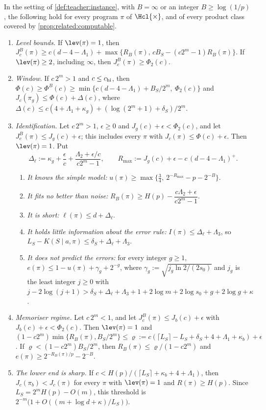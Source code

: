 \begin{theorem}\label{thm:teacher:main}
In the setting of \cref{def:teacher:instance}, with $B=\infty$ or an integer $B\ge\log(1/p)$, the following hold for every program $\pi$ of $\Hcl{\times}$, and of every product class covered by \cref{prop:related:computable}.
\begin{enumerate}[label=(\roman*),start=1,itemsep=1pt,topsep=2pt]
\item[(o)] \emph{Level bounds.} If $\lev(\pi)=1$, then $J^B_c(\pi)\ge c(d-4-\Lambda_1)+\max\{R_B(\pi),\,cB_S-(c2^m-1)R_B(\pi)\}$. If $\lev(\pi)\ge2$, including $\infty$, then $J^B_c(\pi)\ge\Phi_2(c)$.
\item \emph{Window.} If $c\,2^m>1$ and $c\le c_{\rm hi}$, then $\Phi(c)\ge\Phi^B(c)\ge\min\{c(d-4-\Lambda_1)+B_S/2^m,\ \Phi_2(c)\}$ and $J_c(\pi_g)\le\Phi(c)+\Delta(c)$, where $\Delta(c)\le c(4+\Lambda_1+\kappa_g)+(\log(2^m+1)+\delta_S)/2^m$.
\item \emph{Identification.} Let $c\,2^m>1$, $\epsilon\ge0$ and $J_g(c)+\epsilon<\Phi_2(c)$, and let $J^B_c(\pi)\le J_g(c)+\epsilon$; this includes every $\pi$ with $J_c(\pi)\le\Phi(c)+\epsilon$. Then $\lev(\pi)=1$. Put
\[
\Delta_\ell:=\kappa_g+\frac\epsilon c+\frac{\Lambda_2+\epsilon/c}{c2^m-1},\qquad R_{\max}:=J_g(c)+\epsilon-c\,(d-4-\Lambda_1)^+.
\]
\begin{enumerate}[label=(\alph*),itemsep=0pt,topsep=1pt]
\item \emph{It knows the simple model:} $u(\pi)\ge\max\{\frac34,\ 2^{-R_{\max}}-p-2^{-B}\}$.
\item \emph{It fits no better than noise:} $R_B(\pi)\ge H(p)-\dfrac{c\Lambda_2+\epsilon}{c2^m-1}$.
\item \emph{It is short:} $\ell(\pi)\le d+\Delta_\ell$.
\item \emph{It holds little information about the error rule:} $I(\pi)\le\Delta_\ell+\Lambda_3$, so $L_S-K(S\mid a,\pi)\le\delta_S+\Delta_\ell+\Lambda_3$.
\item \emph{It does not predict the errors:} for every integer $g\ge1$, $e(\pi)\le1-u(\pi)+\gamma_g+2^{-g}$, where $\gamma_g:=\sqrt{j_g\ln2/(2s_0)}$ and $j_g$ is the least integer $j\ge0$ with $j-2\log(j+1)>\delta_S+\Delta_\ell+\Lambda_3+1+2\log m+2\log s_0+g+2\log g+\kappa$.
\end{enumerate}
\item \emph{Memoriser regime.} Let $c\,2^m<1$, and let $J^B_c(\pi)\le J_b(c)+\epsilon$ with $J_b(c)+\epsilon<\Phi_2(c)$. Then $\lev(\pi)=1$ and $(1-c2^m)\min\{R_B(\pi),B_S/2^m\}\le\varrho:=c(\lceil L_S\rceil-L_S+\delta_S+4+\Lambda_1+\kappa_b)+\epsilon$. If $\varrho<(1-c2^m)B_S/2^m$, then $R_B(\pi)\le\varrho/(1-c2^m)$ and $e(\pi)\ge2^{-R_B(\pi)/p}-2^{-B}$.
\item \emph{The lower end is sharp.} If $c<H(p)/(\lceil L_S\rceil+\kappa_b+4+\Lambda_1)$, then $J_c(\pi_b)<J_c(\pi)$ for every $\pi$ with $\lev(\pi)=1$ and $R(\pi)\ge H(p)$. Since $L_S=2^mH(p)-O(m)$, this threshold is $2^{-m}\big(1+O((m+\log d+\kappa)/L_S)\big)$.
\end{enumerate}
\end{theorem}

